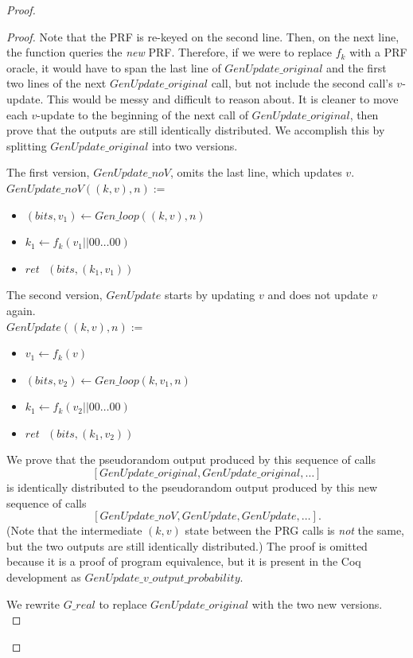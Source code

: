 \documentclass[12pt,lot, lof]{puthesis}
\newenvironment{game}
{ \begin{itemize}[noitemsep,nolistsep] 
}
{ \end{itemize}                  }
\newcommand{\s} {\textrm{ }}
\newcommand{\lar}{\leftarrow}
\begin{document}
\begin{proof}
\begin{proof}
Note that the PRF is re-keyed on the second line. Then, on the next line, the function queries the \emph{new} PRF. Therefore, if we were to replace $f_k$ with a PRF oracle, it would have to span the last line of $GenUpdate\_original$ and the first two lines of the next $GenUpdate\_original$ call, but not include the second call's $v$-update. This would be messy and difficult to reason about. It is cleaner to move each $v$-update to the beginning of the next call of $GenUpdate\_original$, then prove that the outputs are still identically distributed. We accomplish this by splitting $GenUpdate\_original$ into two versions.

The first version, $GenUpdate\_noV$, omits the last line, which updates $v$. \\

$GenUpdate\_noV((k,v), n) :=$
\begin{game}
\item[] $(bits, v_1) \lar Gen\_loop((k,v), n)$
\item[] $k_1 \lar f_k(v_1 || 00 \ldots 00)$
\item[] $ret \s (bits, (k_1, v_1))$\\
\end{game}

The second version, $GenUpdate$ starts by updating $v$ and does not update $v$ again. \\

$GenUpdate((k,v), n) :=$
\begin{game}
\item[] $v_1 \lar f_k(v)$
\item[] $(bits, v_2) \lar Gen\_loop(k, v_1, n)$
\item[] $k_1 \lar f_k(v_2 || 00 \ldots 00)$
\item[] $ret \s (bits, (k_1, v_2))$\\
\end{game}

We prove that the pseudorandom output produced by this sequence of calls $$[GenUpdate\_original, GenUpdate\_original, \ldots]$$ is identically distributed to the pseudorandom output produced by this new sequence of calls $$[GenUpdate\_noV, GenUpdate, GenUpdate, \ldots].$$ (Note that the intermediate $(k,v)$ state between the PRG calls is \emph{not} the same, but the two outputs are still identically distributed.) The proof is omitted because it is a proof of program equivalence, but it is present in the Coq development as $GenUpdate\_v\_output\_probability$. 

We rewrite $G\_real$ to replace $GenUpdate\_original$ with the two new versions.\\


\end{proof}
\end{proof}
\end{document}

